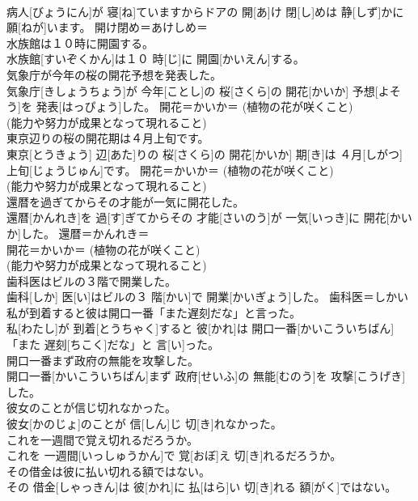 \documentclass[8pt]{extreport}
\begin{document}
\begin{CJK}{UTF8}{min}
{\\	病人[びょうにん]が 寝[ね]ていますからドアの 開[あ]け 閉[し]めは 静[しず]かに 願[ねが]います。	開け閉め＝あけしめ＝ 
\\	水族館は１０時に開園する。	
\\	水族館[すいぞくかん]は１０ 時[じ]に 開園[かいえん]する。	
\\	気象庁が今年の桜の開花予想を発表した。	
\\	気象庁[きしょうちょう]が 今年[ことし]の 桜[さくら]の 開花[かいか] 予想[よそう]を 発表[はっぴょう]した。	開花＝かいか＝ (植物の花が咲くこと) 
\\	(能力や努力が成果となって現れること)
\\	東京辺りの桜の開花期は４月上旬です。	
\\	東京[とうきょう] 辺[あた]りの 桜[さくら]の 開花[かいか] 期[き]は ４月[しがつ] 上旬[じょうじゅん]です。	開花＝かいか＝ (植物の花が咲くこと) 
\\	(能力や努力が成果となって現れること)
\\	還暦を過ぎてからその才能が一気に開花した。	
\\	還暦[かんれき]を 過[す]ぎてからその 才能[さいのう]が 一気[いっき]に 開花[かいか]した。	還暦＝かんれき＝ 
\\	開花＝かいか＝ (植物の花が咲くこと) 
\\	(能力や努力が成果となって現れること)
\\	歯科医はビルの３階で開業した。	
\\	歯科[しか] 医[い]はビルの３ 階[かい]で 開業[かいぎょう]した。	歯科医＝しかい
\\	私が到着すると彼は開口一番「また遅刻だな」と言った。	
\\	私[わたし]が 到着[とうちゃく]すると 彼[かれ]は 開口一番[かいこういちばん]「また 遅刻[ちこく]だな」と 言[い]った。	
\\	開口一番まず政府の無能を攻撃した。	
\\	開口一番[かいこういちばん]まず 政府[せいふ]の 無能[むのう]を 攻撃[こうげき]した。	
\\	彼女のことが信じ切れなかった。	
\\	彼女[かのじょ]のことが 信[しん]じ 切[き]れなかった。	
\\	これを一週間で覚え切れるだろうか。	
\\	これを 一週間[いっしゅうかん]で 覚[おぼ]え 切[き]れるだろうか。	
\\	その借金は彼に払い切れる額ではない。	
\\	その 借金[しゃっきん]は 彼[かれ]に 払[はら]い 切[き]れる 額[がく]ではない。	
}
\end{CJK}
\end{document}
